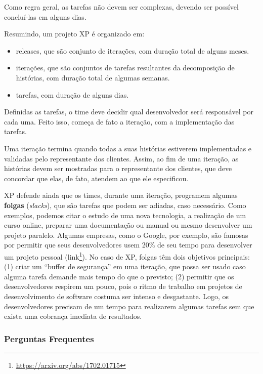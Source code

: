 \documentclass[
  11pt,
  twoside]{book}
\DeclareRobustCommand{\href}[2]{#2\footnote{\url{#1}}}
\begin{document}
Como regra geral, as tarefas não devem ser complexas, devendo ser
possível concluí-las em alguns dias.

Resumindo, um projeto XP é organizado em:

\begin{itemize}
\item
  releases, que são conjunto de iterações, com duração total de alguns
  meses.
\item
  iterações, que são conjuntos de tarefas resultantes da decomposição de
  histórias, com duração total de algumas semanas.
\item
  tarefas, com duração de alguns dias.
\end{itemize}

Definidas as tarefas, o time deve decidir qual desenvolvedor será
responsável por cada uma. Feito isso, começa de fato a iteração, com a
implementação das tarefas.

Uma iteração termina quando todas a suas histórias estiverem
implementadas e validadas pelo representante dos clientes. Assim, ao fim
de uma iteração, as histórias devem ser mostradas para o representante
dos clientes, que deve concordar que elas, de fato, atendem ao que ele
especificou.

 XP defende ainda que os times, durante uma iteração,
programem algumas \textbf{folgas} (\emph{slacks}), que são tarefas que
podem ser adiadas, caso necessário. Como exemplos, podemos citar o
estudo de uma nova tecnologia, a realização de um curso online, preparar
uma documentação ou manual ou mesmo desenvolver um projeto paralelo.
Algumas empresas, como o Google, por exemplo, são famosas por permitir
que seus desenvolvedores usem 20\% de seu tempo para desenvolver um
projeto pessoal (\href{https://arxiv.org/abs/1702.01715}{link}). No caso
de XP, folgas têm dois objetivos principais: (1) criar um ``buffer de
segurança'' em uma iteração, que possa ser usado caso alguma tarefa
demande mais tempo do que o previsto; (2) permitir que os
desenvolvedores respirem um pouco, pois o ritmo de trabalho em projetos
de desenvolvimento de software costuma ser intenso e desgastante. Logo,
os desenvolvedores precisam de um tempo para realizarem algumas tarefas
sem que exista uma cobrança imediata de resultados.

\hypertarget{perguntas-frequentes}{%
\subsubsection*{Perguntas Frequentes}\label{perguntas-frequentes}}
\end{document}
